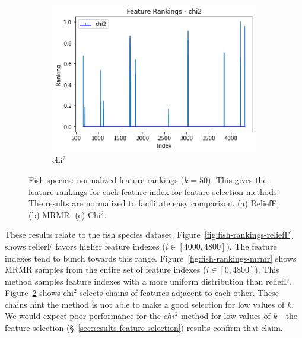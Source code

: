 \documentclass[runningheads]{llncs}
\begin{document}
\begin{figure}[htb]
  \begin{subfigure}[b]{\linewidth}
    \includegraphics[width=1\linewidth]{fish_rankings_k-50_chi2.png}
    \caption{chi$^2$}
    \label{fig:fish-rankings-chi2}
  \end{subfigure}
  \caption[Two numerical solutions]{
    Fish species: normalized feature rankings ($k=50$).
    This gives the feature rankings for each feature index for feature selection methods.
    The results are normalized to facilitate easy comparison.
    (a) ReliefF. (b) MRMR. (c) Chi$^2$.}
\end{figure}

These results relate to the fish species dataset.
Figure~\ref{fig:fish-rankings-reliefF} shows relierF favors higher feature indexes ($i \in [4000, 4800]$).
The feature indexes tend to bunch towards this range.
Figure~\ref{fig:fish-rankings-mrmr} shows MRMR samples from the entire set of feature indexes ($i \in [0, 4800]$).
This method samples feature indexes with a more uniform distribution than reliefF.
Figure~\ref{fig:fish-rankings-chi2} shows chi$^2$ selects chains of features adjacent to each other.
These chains hint the method is not able to make a good selection for low values of $k$.
We would expect poor performance for the $chi^2$ method for low values of $k$ - the feature selection (\S~\ref{sec:results-feature-selection}) results confirm that claim.
\end{document}
